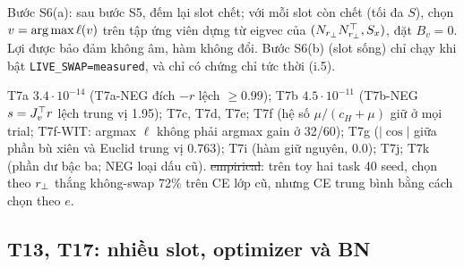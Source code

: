 \begin{hequa}
Bước S6(a): sau bước S5, đếm lại slot chết; với mỗi slot còn chết (tối đa $S$), chọn $v=\operatorname*{arg\,max}\ell(v)$ trên tập ứng viên dựng từ eigvec của $(N_{r_{\perp}}N_{r_{\perp}}^{\top},S_x)$, đặt $B_v=0$. Lợi được bảo đảm không âm, hàm không đổi. Bước S6(b) (slot sống) chỉ chạy khi bật \texttt{LIVE\_SWAP=measured}, và chỉ có chứng chỉ tức thời (i.5).
\end{hequa}
\begin{kiem}
T7a $3.4\cdot10^{-14}$ (T7a-NEG đích $-r$ lệch $\ge0.99$); T7b $4.5\cdot10^{-11}$ (T7b-NEG $s=J_v^{\top} r$ lệch trung vị 1.95); T7c, T7d, T7e; T7f (hệ số $\mu/(c_H+\mu)$ giữ ở mọi trial; T7f-WIT: argmax $\ell$ không phải argmax gain ở 32/60); T7g ($|\cos|$ giữa phần bù xiên và Euclid trung vị 0.763); T7i (hàm giữ nguyên, 0.0); T7j; T7k (phần dư bậc ba; NEG loại dấu cũ). \st{empirical}: trên toy hai task 40 seed, chọn theo $r_{\perp}$ thắng không-swap 72\% trên CE lớp cũ, nhưng CE trung bình bằng cách chọn theo $e$.
\end{kiem}

\subsection{T13, T17: nhiều slot, optimizer và BN}

